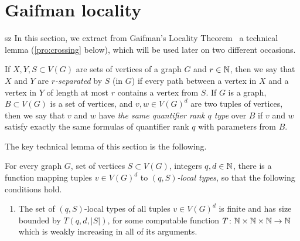 \section{Gaifman locality}\label{sec:gaifman}
\begin{change}{sz}
In this section, we extract from Gaifman's Locality Theorem~\cite{gaifman1982local} a technical lemma
(\cref{pro:crossing} below), which will be used later on two different occasions. 



If $X,Y,S\subset V(G)$ are sets of vertices of a graph $G$ 
and $r\in \mathbb{N}$, then we say that $X$ and $Y$ are  \emph{$r$-separated}
by $S$  (in $G$) if every path between a vertex in $X$ and a vertex in 
$Y$ of length at most $r$ contains a vertex from $S$. If $G$ is a graph, $B\subset V(G)$ is a set of vertices,
and $v,w\in V(G)^d$ are two tuples of vertices, then we say that 
$v$ and $w$ have \emph{the same quantifier rank $q$ type} over $B$
if $v$ and $w$ satisfy exactly the same formulas of quantifier rank $q$ with parameters from $B$.



The key technical lemma of this section is the following.


\begin{lemma}\label{pro:crossing}	
For
every graph $G$, set of vertices $S\subset V(G)$, integers $q,d\in\mathbb{N}$, 
there is a  function mapping tuples  $v\in V(G)^d$
	to \emph{$(q,S)$-local types},
so that the following conditions 
hold.
	 \begin{enumerate}[(1)]
	 	\item\label{c:number} The  set of  $(q,S)$-local types  of all tuples $v\in V(G)^d$  is finite and has size bounded by 
    $T(q,d,|S|)$, for some computable function $T\colon \mathbb{N}\times \mathbb{N}\times\mathbb{N}\to \mathbb{N}$ which is weakly increasing in all of its arguments.

	
		


\end{enumerate}
\end{lemma}
\end{change}
